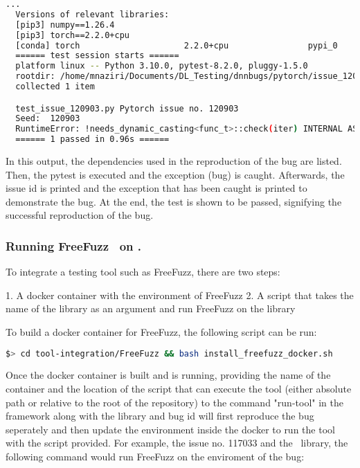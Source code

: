 \documentclass[sigconf,screen]{acmart}
\begin{document}
\begin{lstlisting}[language=bash]
  ...
  Versions of relevant libraries:
  [pip3] numpy==1.26.4
  [pip3] torch==2.2.0+cpu
  [conda] torch                     2.2.0+cpu                pypi_0    pypi
  ====== test session starts ======
  platform linux -- Python 3.10.0, pytest-8.2.0, pluggy-1.5.0
  rootdir: /home/mnaziri/Documents/DL_Testing/dnnbugs/pytorch/issue_120903
  collected 1 item                                                                            

  test_issue_120903.py Pytorch issue no. 120903
  Seed:  120903
  RuntimeError: !needs_dynamic_casting<func_t>::check(iter) INTERNAL ASSERT FAILED at "../aten/src/ATen/native/cpu/Loops.h":310, please report a bug to PyTorch. 
  ====== 1 passed in 0.96s ======
\end{lstlisting}

In this output, the dependencies used in the reproduction of the bug are listed. Then, the pytest is executed and the exception (bug) is caught. Afterwards, the issue id is printed and the exception that has been caught is printed to demonstrate the bug. At the end, the test is shown to be passed, signifying the successful reproduction of the bug.


\subsubsection{Running FreeFuzz~\cite{wei2022free} on \tname.}


To integrate a testing tool such as FreeFuzz, there are two steps:

1. A docker container with the environment of FreeFuzz
2. A script that takes the name of the library as an argument and run FreeFuzz on the library

To build a docker container for FreeFuzz, the following script can be run:

\begin{lstlisting}[language=bash]
  $> cd tool-integration/FreeFuzz && bash install_freefuzz_docker.sh
\end{lstlisting}

Once the docker container is built and is running, providing the name of the container and the location of the script that can execute the tool (either absolute path or relative to the root of the repository) to the command "run-tool" in the framework along with the library and bug id will first reproduce the bug seperately and then update the environment inside the docker to run the tool with the script provided. For example, the issue no. 117033 and the \torch~library, the following command would run FreeFuzz on the enviroment of the bug:
\end{document}
